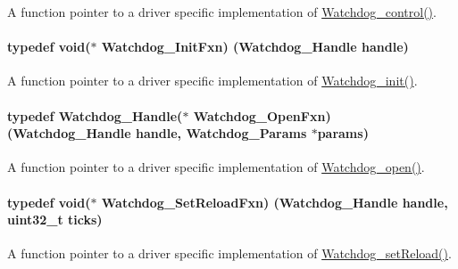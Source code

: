 A function pointer to a driver specific implementation of \hyperlink{_watchdog_8h_aa98a75361edb1e476432669169f2950e}{Watchdog\+\_\+control()}. 

\paragraph[{Watchdog\+\_\+\+Init\+Fxn}]{\setlength{\rightskip}{0pt plus 5cm}typedef void($\ast$ Watchdog\+\_\+\+Init\+Fxn) ({\bf Watchdog\+\_\+\+Handle} handle)}\label{_watchdog_8h_a6401b1a23d9048efb4ed69a074ea60f9}


A function pointer to a driver specific implementation of \hyperlink{_watchdog_8h_afaadfb59be17661ae95562f2081355e7}{Watchdog\+\_\+init()}. 

\paragraph[{Watchdog\+\_\+\+Open\+Fxn}]{\setlength{\rightskip}{0pt plus 5cm}typedef {\bf Watchdog\+\_\+\+Handle}($\ast$ Watchdog\+\_\+\+Open\+Fxn) ({\bf Watchdog\+\_\+\+Handle} handle, {\bf Watchdog\+\_\+\+Params} $\ast$params)}\label{_watchdog_8h_a05ae778da809a34e4d84c95d35ba5f58}


A function pointer to a driver specific implementation of \hyperlink{_watchdog_8h_aa5ce656aa6d5199e1efdb4ca2cd9fb7c}{Watchdog\+\_\+open()}. 

\paragraph[{Watchdog\+\_\+\+Set\+Reload\+Fxn}]{\setlength{\rightskip}{0pt plus 5cm}typedef void($\ast$ Watchdog\+\_\+\+Set\+Reload\+Fxn) ({\bf Watchdog\+\_\+\+Handle} handle, uint32\+\_\+t ticks)}\label{_watchdog_8h_aa81bae05dc1321bcc8ebcda8e9116f66}


A function pointer to a driver specific implementation of \hyperlink{_watchdog_8h_a476ef7b9d4e7268717adf94d8505f4a5}{Watchdog\+\_\+set\+Reload()}. 

